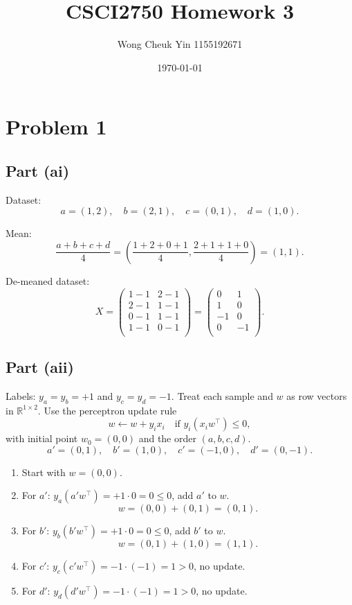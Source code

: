 \documentclass[fleqn]{article}
\title{CSCI2750 Homework 3}
\author{Wong Cheuk Yin 1155192671}
\date{\today}
\begin{document}
    \maketitle
    \section{Problem 1}
    \subsection{Part (ai)}
    Dataset:
    \[
        a = (1, 2),\quad b = (2, 1),\quad c = (0, 1),\quad d = (1, 0).
    \]

    \noindent Mean:
    \[
        \frac{a+b+c+d}{4} = \left(\frac{1+2+0+1}{4}, \frac{2+1+1+0}{4}\right) = (1, 1).
    \]

    \noindent De-meaned dataset:
    \[
        X = \begin{pmatrix}
            1-1 & 2-1 \\
            2-1 & 1-1 \\
            0-1 & 1-1 \\
            1-1 & 0-1 \\
        \end{pmatrix} = \begin{pmatrix}
            0 & 1 \\
            1 & 0 \\
            -1 & 0 \\
            0 & -1 \\
        \end{pmatrix}.
    \]

    \subsection{Part (aii)}
    Labels: $y_a=y_b=+1$ and $y_c=y_d=-1$.  
    Treat each sample and $w$ as row vectors in $\mathbb{R}^{1\times 2}$.
    Use the perceptron update rule
    \[
        w \leftarrow w + y_i x_i
        \quad \text{if } y_i(x_i w^\top)\le 0,
    \]
    with initial point $w_0=(0,0)$ and the order $(a,b,c,d)$.
    \[
        a'=(0,1),\quad b'=(1,0),\quad c'=(-1,0),\quad d'=(0,-1).
    \]

    \begin{enumerate}
        \item Start with $w=(0,0)$.
        \item For $a'$: $y_a(a' w^\top)=+1\cdot 0=0\le 0$, add $a'$ to $w$.
        \[
            w=(0,0)+(0,1)=(0,1).
        \]
        \item For $b'$: $y_b(b' w^\top)=+1\cdot 0=0\le 0$, add $b'$ to $w$.
        \[
            w=(0,1)+(1,0)=(1,1).
        \]
        \item For $c'$: $y_c(c' w^\top)=-1\cdot(-1)=1>0$, no update.
        \item For $d'$: $y_d(d' w^\top)=-1\cdot(-1)=1>0$, no update.
    \end{enumerate}
\end{document}
